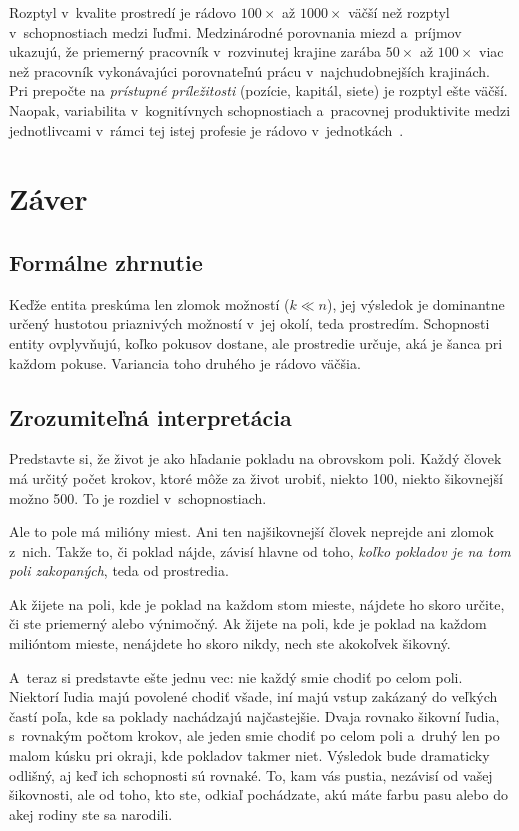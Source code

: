 \documentclass[12pt,a4paper]{article}
\begin{document}
Rozptyl v~kvalite prostredí je rádovo $100\times$ až $1000\times$ väčší než rozptyl v~schopnostiach medzi ľuďmi. Medzinárodné porovnania miezd a~príjmov~\cite{milanovic2015} ukazujú, že priemerný pracovník v~rozvinutej krajine zarába $50\times$ až $100\times$ viac než pracovník vykonávajúci porovnateľnú prácu v~najchudobnejších krajinách. Pri prepočte na \emph{prístupné príležitosti} (pozície, kapitál, siete) je rozptyl ešte väčší. Naopak, variabilita v~kognitívnych schopnostiach a~pracovnej produktivite medzi jednotlivcami v~rámci tej istej profesie je rádovo v~jednotkách~\cite{hunter1998}.

\section{Záver}

\subsection{Formálne zhrnutie}

Keďže entita preskúma len zlomok možností ($k \ll n$), jej výsledok je dominantne určený hustotou priaznivých možností v~jej okolí, teda prostredím. Schopnosti entity ovplyvňujú, koľko pokusov dostane, ale prostredie určuje, aká je šanca pri každom pokuse. Variancia toho druhého je rádovo väčšia.

\subsection{Zrozumiteľná interpretácia}

Predstavte si, že život je ako hľadanie pokladu na obrovskom poli. Každý človek má určitý počet krokov, ktoré môže za život urobiť, niekto 100, niekto šikovnejší možno 500. To je rozdiel v~schopnostiach.

Ale to pole má milióny miest. Ani ten najšikovnejší človek neprejde ani zlomok z~nich. Takže to, či poklad nájde, závisí hlavne od toho, \emph{koľko pokladov je na tom poli zakopaných}, teda od prostredia.

Ak žijete na poli, kde je poklad na každom stom mieste, nájdete ho skoro určite, či ste priemerný alebo výnimočný. Ak žijete na poli, kde je poklad na každom milióntom mieste, nenájdete ho skoro nikdy, nech ste akokoľvek šikovný.

A~teraz si predstavte ešte jednu vec: nie každý smie chodiť po celom poli. Niektorí ľudia majú povolené chodiť všade, iní majú vstup zakázaný do veľkých častí poľa, kde sa poklady nachádzajú najčastejšie. Dvaja rovnako šikovní ľudia, s~rovnakým počtom krokov, ale jeden smie chodiť po celom poli a~druhý len po malom kúsku pri okraji, kde pokladov takmer niet. Výsledok bude dramaticky odlišný, aj keď ich schopnosti sú rovnaké. To, kam vás pustia, nezávisí od vašej šikovnosti, ale od toho, kto ste, odkiaľ pochádzate, akú máte farbu pasu alebo do akej rodiny ste sa narodili.
\end{document}
